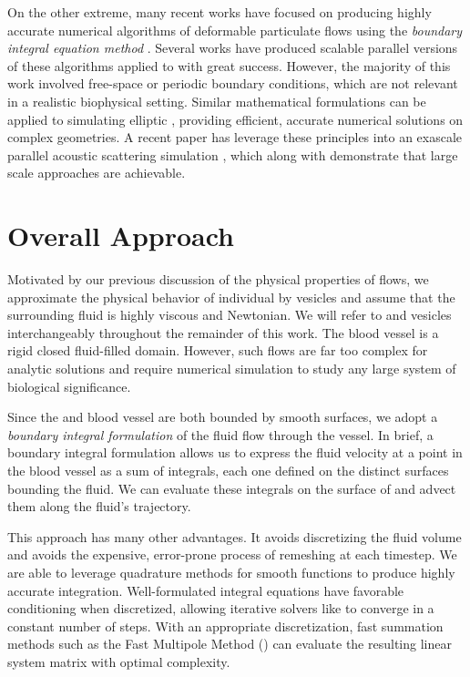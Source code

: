 On the other extreme, many recent works have focused on producing highly accurate numerical algorithms of deformable particulate flows using the \textit{boundary integral equation method} \cite{Veerapaneni2009b,Veerapaneni2011,rahimian2015,sorgentone2018highly,sorgentone20193d,af2016fast,Zhao2010}.
Several works \cite{lu2018parallel,Malhotra2017,rahimian2010petascale} have produced scalable parallel versions of these algorithms applied to \rbcs with great success.
However, the majority of this work involved free-space or periodic boundary conditions, which are not relevant in a realistic biophysical setting.
Similar mathematical formulations can be applied to simulating elliptic \pdes \cite{YBZ,wala20183d,wala2018optimization,bruno2013high}, providing efficient, accurate numerical solutions on complex geometries.
A recent paper has leverage these principles into an exascale parallel acoustic scattering simulation \cite{abduljabbar2019extreme}, which along with \cite{rahimian2010petascale} demonstrate that large scale \bie approaches are achievable.

\section{Overall Approach}
Motivated by our previous discussion of the physical properties of \rbc flows, we approximate the physical behavior of individual \rbcs by vesicles and assume that the surrounding fluid is highly viscous and Newtonian.
We will refer to \rbcs and vesicles interchangeably throughout the remainder of this work.
The blood vessel is a rigid closed fluid-filled domain. 
However, such flows are far too complex for analytic solutions and require numerical simulation to study any large system of biological significance.

Since the \rbcs and blood vessel are both bounded by smooth surfaces, we adopt a \textit{boundary integral formulation} of the fluid flow through the vessel.
In brief, a boundary integral formulation allows us to express the fluid velocity at a point in the blood vessel as a sum of integrals, each one defined on the distinct surfaces bounding the fluid.
We can evaluate these integrals on the surface of \rbcs and advect them along the fluid's trajectory. 

This approach has many other advantages. 
It avoids discretizing the fluid volume and avoids the expensive, error-prone process of remeshing at each timestep.
We are able to leverage quadrature methods for smooth functions to produce highly accurate integration.
Well-formulated integral equations have favorable conditioning when discretized, allowing iterative solvers like \gmres to converge in a constant number of steps.
With an appropriate discretization, fast summation methods such as the Fast Multipole Method (\fmm) can evaluate the resulting linear system matrix with optimal complexity.


